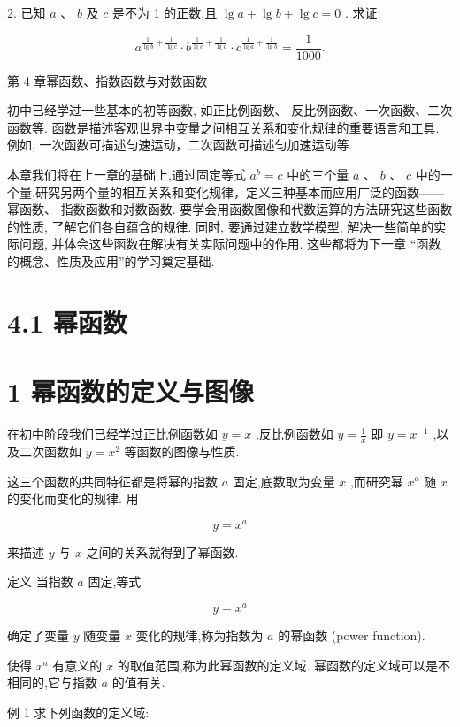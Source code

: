 \documentclass[10pt]{article}
\begin{document}
2. 已知 \(a\text{ 、 }b\) 及 \(c\) 是不为 1 的正数,且 \(\lg a + \lg b + \lg c = 0\) . 求证:

\[
{a}^{\frac{1}{\lg b} + \frac{1}{\lg c}} \cdot  {b}^{\frac{1}{\lg c} + \frac{1}{\lg a}} \cdot  {c}^{\frac{1}{\lg a} + \frac{1}{\lg b}} = \frac{1}{1000}.
\]





第 4 章幂函数、指数函数与对数函数

初中已经学过一些基本的初等函数, 如正比例函数、 反比例函数、一次函数、二次函数等. 函数是描述客观世界中变量之间相互关系和变化规律的重要语言和工具. 例如, 一次函数可描述匀速运动，二次函数可描述匀加速运动等.

本章我们将在上一章的基础上,通过固定等式 \({a}^{b} = c\) 中的三个量 \(a\) 、 \(b\) 、 \(c\) 中的一个量,研究另两个量的相互关系和变化规律，定义三种基本而应用广泛的函数——幂函数、 指数函数和对数函数. 要学会用函数图像和代数运算的方法研究这些函数的性质, 了解它们各自蕴含的规律. 同时, 要通过建立数学模型, 解决一些简单的实际问题, 并体会这些函数在解决有关实际问题中的作用. 这些都将为下一章 “函数的概念、性质及应用”的学习奠定基础.

\section*{4.1 幂函数}

\section*{1 幂函数的定义与图像}

在初中阶段我们已经学过正比例函数如 \(y = x\) ,反比例函数如 \(y = \frac{1}{x}\) 即 \(y = {x}^{-1}\) ,以及二次函数如 \(y = {x}^{2}\) 等函数的图像与性质.

这三个函数的共同特征都是将幂的指数 \(a\) 固定,底数取为变量 \(x\) ,而研究幂 \({x}^{a}\) 随 \(x\) 的变化而变化的规律. 用

\[
y = {x}^{a}
\]

来描述 \(y\) 与 \(x\) 之间的关系就得到了幂函数.

定义 当指数 \(a\) 固定,等式

\[
y = {x}^{a}
\]

确定了变量 \(y\) 随变量 \(x\) 变化的规律,称为指数为 \(a\) 的幂函数 (power function).

使得 \({x}^{a}\) 有意义的 \(x\) 的取值范围,称为此幂函数的定义域. 幂函数的定义域可以是不相同的,它与指数 \(a\) 的值有关.

例 1 求下列函数的定义域:
\end{document}
